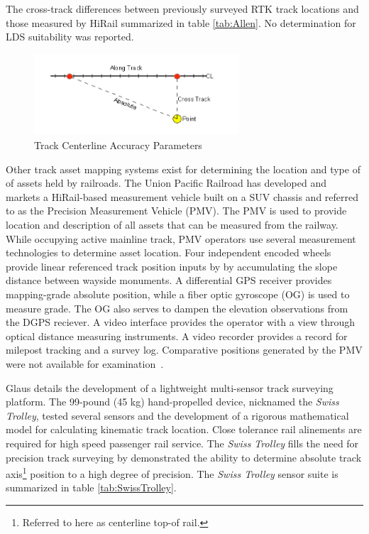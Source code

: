 The cross-track differences between previously surveyed RTK track locations and those measured by HiRail summarized in table \ref{tab:Allen}. No determination for LDS suitability was reported.
\begin{figure}[!htp]
	\vspace{-30pt}
		\begin{center}
			\includegraphics[width=3in]{graphics/AllenTrackRef.png}
			\caption{Track Centerline Accuracy Parameters~\citep{2006AllenAssetMap}}\label{fig:trackRef}
		\end{center}
	\vspace{-30pt}
\end{figure}
Other track asset mapping systems exist for determining the location and type of of assets held by railroads. The Union Pacific Railroad has developed and markets a HiRail-based measurement vehicle built on a SUV chassis and referred to as the Precision Measurement Vehicle (PMV). The PMV is used to provide location and description of all assets that can be measured from the railway. While occupying active mainline track, PMV operators use several measurement technologies to determine asset location. Four independent encoded wheels provide linear referenced track position inputs by by accumulating the slope distance between wayside monuments. A differential GPS receiver provides mapping-grade absolute position, while a fiber optic gyroscope (OG) is used to measure grade. The OG also serves to dampen the elevation observations from the DGPS reciever. A video interface provides the operator with a view through optical distance measuring instruments. A video recorder provides a record for milepost tracking and a survey log. Comparative positions generated by the PMV were not available for examination~\citep{2008pmv}.

Glaus details the development of a lightweight multi-sensor track surveying platform. The 99-pound (45 kg) hand-propelled device, nicknamed the \emph{Swiss Trolley}, tested several sensors and the development of a rigorous mathematical model for calculating kinematic track location. Close tolerance rail alinements are required for high speed passenger rail service. The \emph{Swiss Trolley} fills the need for precision track surveying by demonstrated the ability to determine absolute track axis\footnote{Referred to here as centerline top-of rail.} position to a high degree of precision. The \emph{Swiss Trolley} sensor suite is summarized in table \ref{tab:SwissTrolley}.

